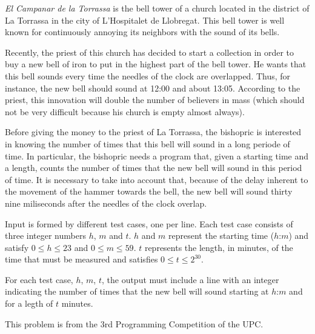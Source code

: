 

\Statement


\emph{El Campanar de la Torrassa} is the bell tower of a church
located in the district of La Torrassa in the city of L'Hospitalet de
Llobregat. This bell tower is well known for continuously annoying its
neighbors with the sound of its bells.

\medskip 

Recently, the priest of this church has decided to start a collection
in order to buy a new bell of iron to put in the highest part
of the bell tower. He wants that this bell sounds every time
the needles of the clock are overlapped. Thus, for instance, the new bell should
sound at 12:00 and about 13:05. According to the priest, this
innovation will double the number of believers in mass (which
should not be very difficult because his church is empty almost always).

\medskip

Before giving the money to the priest of La Torrassa, the
bishopric is interested in knowing the number of times that this bell
will sound in a long periode of time. In particular,
the bishopric needs a program that, given a starting time and a length,
counts the number of times that the new
bell will sound in this period of time.
It is necessary to take into account that, because of the
delay inherent to the movement of the hammer towards the bell, the new
bell will sound thirty nine miliseconds after the needles of the clock
overlap.



\Input

Input is formed by different test cases, one per line.
Each test case consists of three integer numbers $h$, $m$ and $t$. $h$ and $m$ 
represent the starting time 
($h$:$m$) and satisfy $0\le h\le 23$ and $0\le m\le 59$. $t$
represents the length, in minutes, of the time that must be measured and satisfies
$0\le t \le2^{30}$. 

\Output

For each test case, $h$, $m$, $t$,
the output must include a line with an integer indicating
the number of times that the new bell will sound starting at
$h$:$m$ and for a legth of $t$ minutes.


\Observation

This problem is from the 3rd Programming Competition of the UPC.
